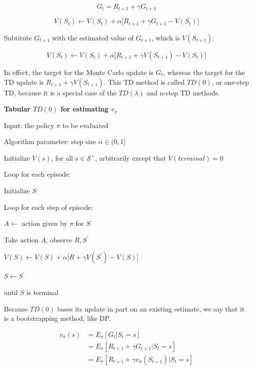 \documentclass{article}
\begin{document}
$$
G_{t}=R_{t+1} + \gamma G_{t+1}
$$

$$
V ( S _ { t } ) \leftarrow V ( S _ { t } ) + \alpha \Big [ R _ { t + 1 } + \gamma G _ { t + 1 } - V ( S _ { t } ) \Big ]
$$

Subtitute \(G_{t+1}\) with the estimated value of \(G_{t+1}\), which is \(V(S_{t+1})\):

$$
V ( S _ { t } ) \leftarrow V ( S _ { t } ) + \alpha \Big [ R _ { t + 1 } + \gamma V ( S _ { t + 1 } ) - V ( S _ { t } ) \Big ]
$$

In effect, the target for the Monte Carlo update is $G _ { t }$, whereas the target for the TD update is $R _ { t + 1 } + \gamma V ( S _ { t + 1 } )$.
This TD method is called $TD(0)$, or one-step TD, because it is a special case of the $TD ( \lambda )$ and n-step TD methods.

\textbf{Tabular $ TD(0) $ for estimating $ v _ { \pi } $}

Input: the policy $ \pi $ to be evaluated

Algorithm parameter: step size $ \alpha \in ( 0 , 1 ]$

Initialize $V ( s )$, for all $s \in \mathcal { S } ^ { + }$, arbitrarily except that $V(terminal) = 0$

Loop for each episode:

\hspace{.5cm} Initialize $S$

\hspace{.5cm} Loop for each step of episode:

\hspace{1cm} $A \leftarrow$ action given by $ \pi $ for $S$

\hspace{1cm} Take action $A$, observe $R , S ^ { \prime }$

\hspace{1cm} $V ( S ) \leftarrow V ( S ) + \alpha \big [ R + \gamma V ( S ^ { \prime } ) - V ( S ) \big ]$

\hspace{1cm} $S \leftarrow S ^ { \prime }$

\hspace{.5cm} until $S$ is terminal

Because $TD(0)$ bases its update in part on an existing estimate, we say that it is a bootstrapping method, like DP.

$$
\begin{aligned}
{ v _ { \pi } ( s ) } & { } = E _ { \pi } [ G _ { t } | S _ { t } = s ] \\
{ } & { } = E _ { \pi } [ R _ { t + 1 } + \gamma G _ { t + 1 } | S _ { t } = s ] \\
{ } & { } = E _ { \pi } [ R _ { t + 1 } + \gamma v _ { \pi } ( S _ { t + 1 } ) | S _ { t } = s ]
\end{aligned}
$$
\end{document}

